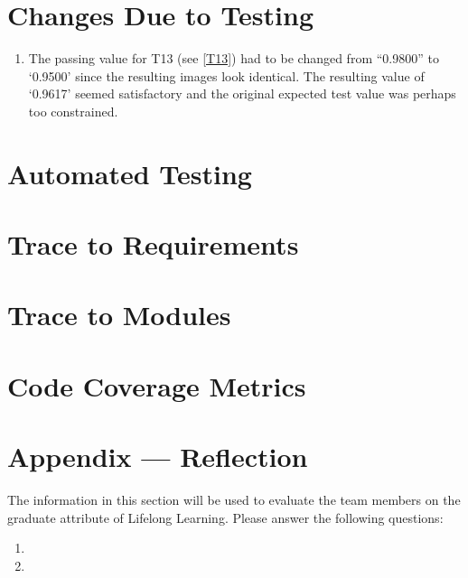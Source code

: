 \documentclass[12pt, titlepage]{article}
\begin{document}
\section{Changes Due to Testing}
\begin{enumerate}
  \item The passing value for T13 (see \ref{T13}) had to be changed from ``0.9800'' to `0.9500' since the
    resulting images look identical. The resulting value of `0.9617' seemed satisfactory and the original
    expected test value was perhaps too constrained.
\end{enumerate}


\section{Automated Testing}
		
\section{Trace to Requirements}
		
\section{Trace to Modules}		

\section{Code Coverage Metrics}






\newpage{}
\section*{Appendix --- Reflection}

The information in this section will be used to evaluate the team members on the
graduate attribute of Lifelong Learning.  Please answer the following questions:

\begin{enumerate}
  \item 
  \item 
\end{enumerate}
\end{document}

